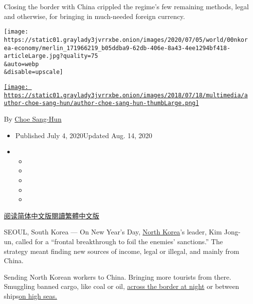 Closing the border with China crippled the regime's few remaining
methods, legal and otherwise, for bringing in much-needed foreign
currency.

\texttt{[image: https://static01.graylady3jvrrxbe.onion/images/2020/07/05/world/00nkorea-economy/merlin\_171966219\_b05ddba9-62db-406e-8a43-4ee1294bf418-articleLarge.jpg?quality=75\\\&auto=webp\\\&disable=upscale]}

\href{https://www.nytimes3xbfgragh.onion/by/choe-sang-hun}{\texttt{[image: https://static01.graylady3jvrrxbe.onion/images/2018/07/18/multimedia/author-choe-sang-hun/author-choe-sang-hun-thumbLarge.png]}}

By \href{https://www.nytimes3xbfgragh.onion/by/choe-sang-hun}{Choe
Sang-Hun}

\begin{itemize}
\item
  Published July 4, 2020Updated Aug. 14, 2020
\item
  \begin{itemize}
  \item
  \item
  \item
  \item
  \item
  \end{itemize}
\end{itemize}

\href{https://cn.nytimes3xbfgragh.onion/asia-pacific/20200706/north-korea-sanctions-coronavirus/}{阅读简体中文版}\href{https://cn.nytimes3xbfgragh.onion/asia-pacific/20200706/north-korea-sanctions-coronavirus/zh-hant/}{閱讀繁體中文版}

SEOUL, South Korea --- On New Year's Day,
\href{https://www.nytimes3xbfgragh.onion/2020/08/14/world/asia/north-korea-floods-coronavirus.html}{North
Korea}'s leader, Kim Jong-un, called for a ``frontal breakthrough to
foil the enemies' sanctions.'' The strategy meant finding new sources of
income, legal or illegal, and mainly from China.

Sending North Korean workers to China. Bringing more tourists from
there. Smuggling banned cargo, like coal or oil,
\href{http://vod.kbs.co.kr/index.html?source=episode\&sname=vod\&stype=vod\&program_code=T2011-1097\&program_id=PS-2019197532-01-000\&section_code=05\&broadcast_complete_yn=N\&local_station_code=00\&section_sub_code=06}{across
the border at night} or between
ships\href{https://www.nytimes3xbfgragh.onion/2018/01/18/world/asia/north-korea-oil-smuggling.html}{on
high seas.}

